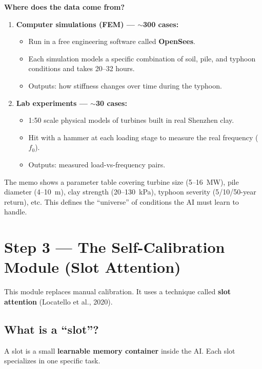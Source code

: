 \documentclass[11pt,a4paper]{article}
\begin{document}
\textbf{Where does the data come from?}
\begin{enumerate}
  \item \textbf{Computer simulations (FEM) --- $\sim$300 cases:}
    \begin{itemize}[noitemsep]
      \item Run in a free engineering software called \textbf{OpenSees}.
      \item Each simulation models a specific combination of soil, pile, and
            typhoon conditions and takes 20--32 hours.
      \item Outputs: how stiffness changes over time during the typhoon.
    \end{itemize}

  \item \textbf{Lab experiments --- $\sim$30 cases:}
    \begin{itemize}[noitemsep]
      \item 1:50 scale physical models of turbines built in real Shenzhen clay.
      \item Hit with a hammer at each loading stage to measure the real
            frequency ($f_0$).
      \item Outputs: measured load-vs-frequency pairs.
    \end{itemize}
\end{enumerate}

The memo shows a parameter table covering turbine size (5--16~MW), pile
diameter (4--10~m), clay strength (20--130~kPa), typhoon severity
(5/10/50-year return), etc.  This defines the ``universe'' of conditions the
AI must learn to handle.

\section{Step 3 --- The Self-Calibration Module (Slot Attention)}
\label{sec:slots}

This module replaces manual calibration.  It uses a technique called
\textbf{slot attention} (Locatello et al., 2020).

\subsection{What is a ``slot''?}

A slot is a small \textbf{learnable memory container} inside the AI.  Each
slot specializes in one specific task.
\end{document}
